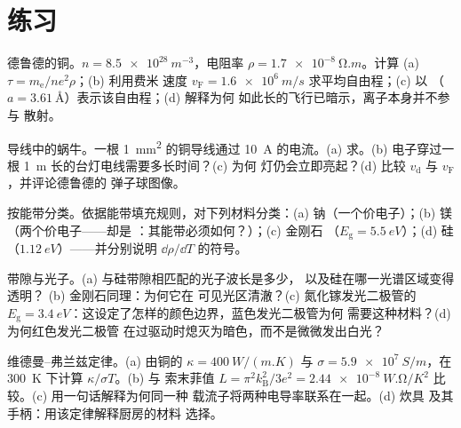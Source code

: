 \section{练习}

\begin{exercise}[$\star$]\label{exo:b3:electrons-in-solids:1}
德鲁德的铜。$n = \qty{8.5e28}{m^{-3}}$，电阻率
$\rho = \qty{1.7e-8}{\ohm.m}$。计算 (a) $\tau =
m_{\text{e}}/ne^2\rho$；(b) 利用费米
速度 $v_{\text{F}} = \qty{1.6e6}{m/s}$ 求平均自由程；(c) 以
（$a = \qty{3.61}{\angstrom}$）表示该自由程；(d) 解释为何
如此长的飞行已暗示，离子本身并不参与
散射。
\end{exercise}

\begin{exercise}[$\star$]\label{exo:b3:electrons-in-solids:2}
导线中的蜗牛。一根 \qty{1}{mm^2} 的铜导线通过
\qty{10}{A} 的电流。(a) 求。(b) 电子穿过一根
\qty{1}{m} 长的台灯电线需要多长时间？(c) 为何
灯仍会立即亮起？(d) 比较
$v_{\text{d}}$ 与 $v_{\text{F}}$，并评论德鲁德的
弹子球图像。
\end{exercise}

\begin{exercise}[$\star$]\label{exo:b3:electrons-in-solids:3}
按能带分类。依据能带填充规则，对下列材料分类：(a)
钠（一个价电子）；(b) 镁（两个价电子——却是
：其能带必须如何？）；(c) 金刚石
（$E_{\text{g}} = \qty{5.5}{eV}$）；(d) 硅
（$\qty{1.12}{eV}$）——并分别说明
$\dd\rho/\dd T$ 的符号。
\end{exercise}

\begin{exercise}[$\star$]\label{exo:b3:electrons-in-solids:4}
带隙与光子。(a) 与硅带隙相匹配的光子波长是多少，
以及硅在哪一光谱区域变得透明？
(b) 金刚石同理：为何它在
可见光区清澈？(c) 氮化镓发光二极管的 $E_{\text{g}} =
\qty{3.4}{eV}$：这设定了怎样的颜色边界，蓝色发光二极管为何
需要这种材料？(d) 为何红色发光二极管
在过驱动时熄灭为暗色，而不是微微发出白光？
\end{exercise}

\begin{exercise}[$\star\star$]\label{exo:b3:electrons-in-solids:5}
维德曼–弗兰兹定律。(a) 由铜的 $\kappa =
\qty{400}{W/(m.K)}$ 与 $\sigma = \qty{5.9e7}{S/m}$，在
\qty{300}{K} 下计算 $\kappa/\sigma T$。(b) 与
索末菲值 $L = \pi^2k_{\text{B}}^2/3e^2 =
\qty{2.44e-8}{W.\ohm/K^2}$ 比较。(c) 用一句话解释为何同一种
载流子将两种电导率联系在一起。(d) 炊具
及其手柄：用该定律解释厨房的材料
选择。
\end{exercise}

